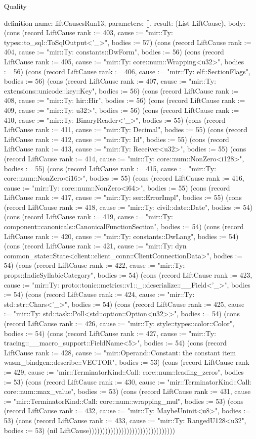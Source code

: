 \begin{lexlean}{Quality}
\begin{semanticmodule}
definition{
  name: liftCausesRun13,
  parameters: [],
  result: (List LiftCause),
  body: (cons (record LiftCause {rank := 403, cause := "mir::Ty: types::to_sql::ToSqlOutput<'_>", bodies := 57}) (cons (record LiftCause {rank := 404, cause := "mir::Ty: constants::DwForm", bodies := 56}) (cons (record LiftCause {rank := 405, cause := "mir::Ty: core::num::Wrapping<u32>", bodies := 56}) (cons (record LiftCause {rank := 406, cause := "mir::Ty: elf::SectionFlags", bodies := 56}) (cons (record LiftCause {rank := 407, cause := "mir::Ty: extensions::unicode::key::Key", bodies := 56}) (cons (record LiftCause {rank := 408, cause := "mir::Ty: hir::Hir", bodies := 56}) (cons (record LiftCause {rank := 409, cause := "mir::Ty: u32>", bodies := 56}) (cons (record LiftCause {rank := 410, cause := "mir::Ty: BinaryReader<'_>", bodies := 55}) (cons (record LiftCause {rank := 411, cause := "mir::Ty: Decimal", bodies := 55}) (cons (record LiftCause {rank := 412, cause := "mir::Ty: Id", bodies := 55}) (cons (record LiftCause {rank := 413, cause := "mir::Ty: Receiver<u32>", bodies := 55}) (cons (record LiftCause {rank := 414, cause := "mir::Ty: core::num::NonZero<i128>", bodies := 55}) (cons (record LiftCause {rank := 415, cause := "mir::Ty: core::num::NonZero<i16>", bodies := 55}) (cons (record LiftCause {rank := 416, cause := "mir::Ty: core::num::NonZero<i64>", bodies := 55}) (cons (record LiftCause {rank := 417, cause := "mir::Ty: ser::ErrorImpl", bodies := 55}) (cons (record LiftCause {rank := 418, cause := "mir::Ty: civil::date::Date", bodies := 54}) (cons (record LiftCause {rank := 419, cause := "mir::Ty: component::canonicals::CanonicalFunctionSection", bodies := 54}) (cons (record LiftCause {rank := 420, cause := "mir::Ty: constants::DwLang", bodies := 54}) (cons (record LiftCause {rank := 421, cause := "mir::Ty: dyn common_state::State<client::client_conn::ClientConnectionData>", bodies := 54}) (cons (record LiftCause {rank := 422, cause := "mir::Ty: props::IndicSyllabicCategory", bodies := 54}) (cons (record LiftCause {rank := 423, cause := "mir::Ty: proto::tonic::metrics::v1::_::deserialize::__Field<'_>", bodies := 54}) (cons (record LiftCause {rank := 424, cause := "mir::Ty: std::str::Chars<'_>", bodies := 54}) (cons (record LiftCause {rank := 425, cause := "mir::Ty: std::task::Poll<std::option::Option<u32>>", bodies := 54}) (cons (record LiftCause {rank := 426, cause := "mir::Ty: style::types::color::Color", bodies := 54}) (cons (record LiftCause {rank := 427, cause := "mir::Ty: tracing::__macro_support::FieldName<5>", bodies := 54}) (cons (record LiftCause {rank := 428, cause := "mir::Operand::Constant: the constant item wasm_bindgen::describe::VECTOR", bodies := 53}) (cons (record LiftCause {rank := 429, cause := "mir::TerminatorKind::Call: core::num::leading_zeros", bodies := 53}) (cons (record LiftCause {rank := 430, cause := "mir::TerminatorKind::Call: core::num::max_value", bodies := 53}) (cons (record LiftCause {rank := 431, cause := "mir::TerminatorKind::Call: core::num::wrapping_mul", bodies := 53}) (cons (record LiftCause {rank := 432, cause := "mir::Ty: MaybeUninit<u8>", bodies := 53}) (cons (record LiftCause {rank := 433, cause := "mir::Ty: RangedU128<u32", bodies := 53}) (nil LiftCause))))))))))))))))))))))))))))))))
}
\end{semanticmodule}
\end{lexlean}
